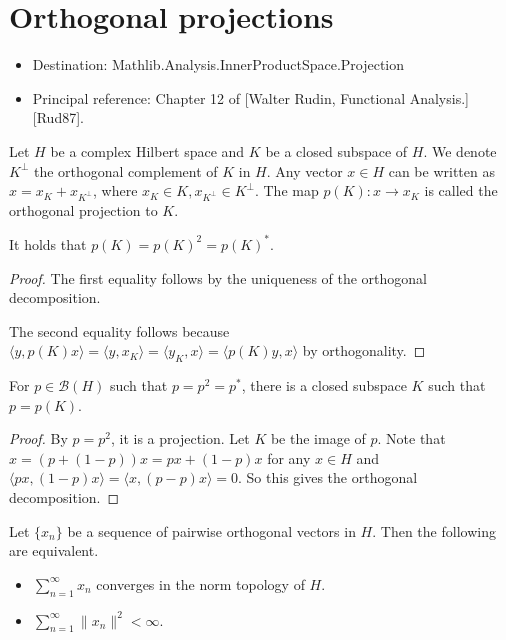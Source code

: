 \chapter{Orthogonal projections}


\begin{itemize}
  \item Destination: Mathlib.Analysis.InnerProductSpace.Projection
  \item Principal reference: Chapter 12 of [Walter Rudin, Functional Analysis.][Rud87].
\end{itemize}

Let $H$ be a complex Hilbert space and $K$ be a closed subspace of $H$.
We denote $K^\perp$ the orthogonal complement of $K$ in $H$.
Any vector $x \in H$ can be written as $x = x_K + x_{K^\perp}$, where $x_K \in K, x_{K^\perp} \in K^\perp$.
The map $p(K) : x \to x_K$ is called the orthogonal projection to $K$.
\begin{lemma}
  \label{lem:projection_projection}
  It holds that $p(K) = p(K)^2 = p(K)^*$.
\end{lemma}

\begin{proof}
  The first equality follows by the uniqueness of the orthogonal decomposition.

  The second equality follows because $\langle y, p(K)x \rangle = \langle y, x_K\rangle = \langle y_K, x \rangle = \langle p(K)y, x\rangle$
  by orthogonality.
\end{proof}

\begin{lemma}
  \label{lem:exists_subspace}
  For $p \in \mathcal{B}(H)$ such that $p = p^2 = p^*$,
  there is a closed subspace $K$ such that $p = p(K)$.
\end{lemma}

\begin{proof}
  By $p = p^2$, it is a projection. Let $K$ be the image of $p$.
  Note that $x = (p + (1-p))x = px + (1-p)x$ for any $x \in H$
  and $\langle px, (1-p)x\rangle = \langle x, (p-p)x\rangle = 0$.
  So this gives the orthogonal decomposition.
\end{proof}

\begin{lemma}
  \label{lem:sum_orthogonal}
  Let $\{x_n\}$ be a sequence of pairwise orthogonal vectors in $H$.
  Then the following are equivalent.
  \begin{itemize}
    \item $\sum_{n=1}^\infty x_n$ converges in the norm topology of $H$.
    \item $\sum_{n=1}^\infty \|x_n\|^2 < \infty$.
  \end{itemize}
\end{lemma}

